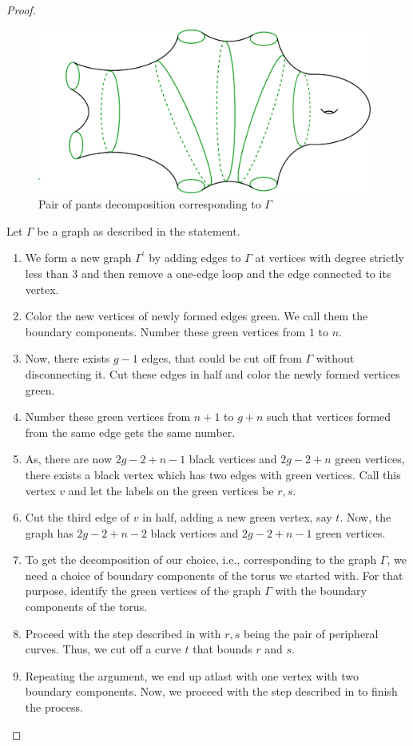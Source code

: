 \begin{proof}
	\begin{figure}[h]
            \centering
		\includegraphics[width=11cm]{Chapter2/Figs/decomp}
		\caption{Pair of pants decomposition corresponding to $\Gamma$}
		\label{fig:Gen}
	\end{figure} 
	Let $\Gamma$ be a graph as described in the statement. 
	\begin{enumerate}
		\item We form a new graph $\Gamma^\prime$ by adding edges to $\Gamma$ at vertices with degree strictly less than 3 and then remove a one-edge loop and the edge connected to its vertex.
		\item Color the new vertices of newly formed edges green. We call them the boundary components. Number these green vertices from $1$ to $n$.
		\item Now, there exists $g-1$ edges, that could be cut off from $\Gamma$ without disconnecting it. Cut these edges in half and color the newly formed vertices green.
		\item Number these green vertices from $n+1$ to $g+n$ such that vertices formed from the same edge gets the same number.
		\item As, there are now $2g-2+n-1$ black vertices and $2g-2+n$ green vertices, there exists a black vertex which has two edges with green vertices. Call this vertex $v$ and let the labels on the green vertices be $r,s$.
		\item Cut the third edge of $v$ in half, adding a new green vertex, say $t$. Now, the graph has $2g-2+n-2$ black vertices and $2g-2+n-1$ green vertices. 
		\item To get the decomposition of our choice, i.e., corresponding to the graph $\Gamma$, we need a choice of boundary components of the torus we started with. For that purpose, identify the green vertices of the graph $\Gamma$ with the boundary components of the torus.   
		\item Proceed with the step described in \cite[Section 5.1-5.6]{GKM} with $r,s$ being the pair of peripheral curves. Thus, we cut off a curve $t$ that bounds $r$ and $s$.
		\item Repeating the argument, we end up atlast with one vertex with two boundary components. Now, we proceed with the step described in \cite[Section 5.7]{GKM} to finish the process.
	\end{enumerate} 

\end{proof}